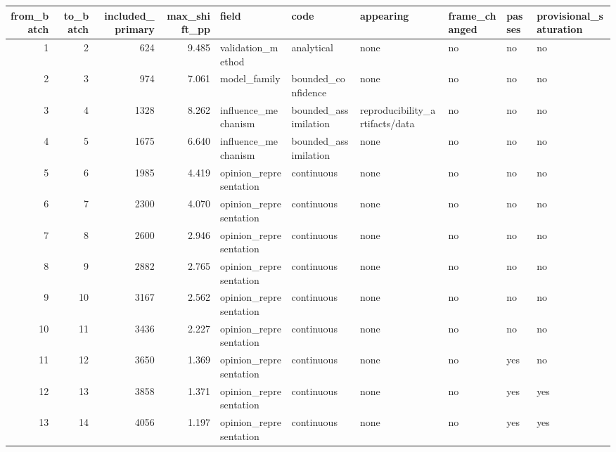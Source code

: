 \begin{tabular}{rrrrllllll}
\toprule
from\_batch & to\_batch & included\_primary & max\_shift\_pp & field & code & appearing & frame\_changed & passes & provisional\_saturation \\
\midrule
1 & 2 & 624 & 9.485 & validation\_method & analytical & none & no & no & no \\
2 & 3 & 974 & 7.061 & model\_family & bounded\_confidence & none & no & no & no \\
3 & 4 & 1328 & 8.262 & influence\_mechanism & bounded\_assimilation & reproducibility\_artifacts/data & no & no & no \\
4 & 5 & 1675 & 6.640 & influence\_mechanism & bounded\_assimilation & none & no & no & no \\
5 & 6 & 1985 & 4.419 & opinion\_representation & continuous & none & no & no & no \\
6 & 7 & 2300 & 4.070 & opinion\_representation & continuous & none & no & no & no \\
7 & 8 & 2600 & 2.946 & opinion\_representation & continuous & none & no & no & no \\
8 & 9 & 2882 & 2.765 & opinion\_representation & continuous & none & no & no & no \\
9 & 10 & 3167 & 2.562 & opinion\_representation & continuous & none & no & no & no \\
10 & 11 & 3436 & 2.227 & opinion\_representation & continuous & none & no & no & no \\
11 & 12 & 3650 & 1.369 & opinion\_representation & continuous & none & no & yes & no \\
12 & 13 & 3858 & 1.371 & opinion\_representation & continuous & none & no & yes & yes \\
13 & 14 & 4056 & 1.197 & opinion\_representation & continuous & none & no & yes & yes \\
\bottomrule
\end{tabular}
